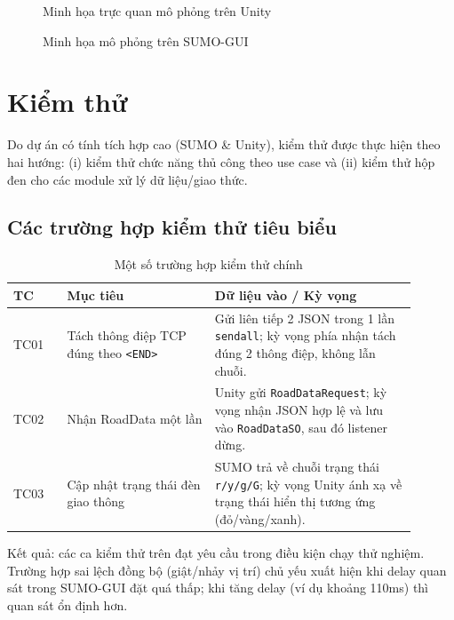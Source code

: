 \documentclass[../DoAn.tex]{subfiles}
\begin{document}
\begin{figure}[htbp]
	\centering
	\caption{Minh họa trực quan mô phỏng trên Unity}
	\label{fig:demo_unity}
\end{figure}

\begin{figure}[htbp]
	\centering
	\caption{Minh họa mô phỏng trên SUMO-GUI}
	\label{fig:demo_sumo}
\end{figure}

\section{Kiểm thử}
Do dự án có tính tích hợp cao (SUMO \& Unity), kiểm thử được thực hiện theo hai hướng: (i) kiểm thử chức năng thủ công theo use case và (ii) kiểm thử hộp đen cho các module xử lý dữ liệu/giao thức.

\subsection*{Các trường hợp kiểm thử tiêu biểu}
\begin{table}[htbp]
\centering
\begin{tabular}{p{0.12\linewidth}p{0.33\linewidth}p{0.45\linewidth}}
\hline
\textbf{TC} & \textbf{Mục tiêu} & \textbf{Dữ liệu vào / Kỳ vọng} \\ \hline
TC01 & Tách thông điệp TCP đúng theo \texttt{<END>} & Gửi liên tiếp 2 JSON trong 1 lần \texttt{sendall}; kỳ vọng phía nhận tách đúng 2 thông điệp, không lẫn chuỗi. \\ \hline
TC02 & Nhận RoadData một lần & Unity gửi \texttt{RoadDataRequest}; kỳ vọng nhận JSON hợp lệ và lưu vào \texttt{RoadDataSO}, sau đó listener dừng. \\ \hline
TC03 & Cập nhật trạng thái đèn giao thông & SUMO trả về chuỗi trạng thái \texttt{r/y/g/G}; kỳ vọng Unity ánh xạ về trạng thái hiển thị tương ứng (đỏ/vàng/xanh). \\ \hline
\end{tabular}
\caption{Một số trường hợp kiểm thử chính}
\label{table:testcases}
\end{table}

Kết quả: các ca kiểm thử trên đạt yêu cầu trong điều kiện chạy thử nghiệm. Trường hợp sai lệch đồng bộ (giật/nhảy vị trí) chủ yếu xuất hiện khi delay quan sát trong SUMO-GUI đặt quá thấp; khi tăng delay (ví dụ khoảng 110ms) thì quan sát ổn định hơn.
\end{document}
